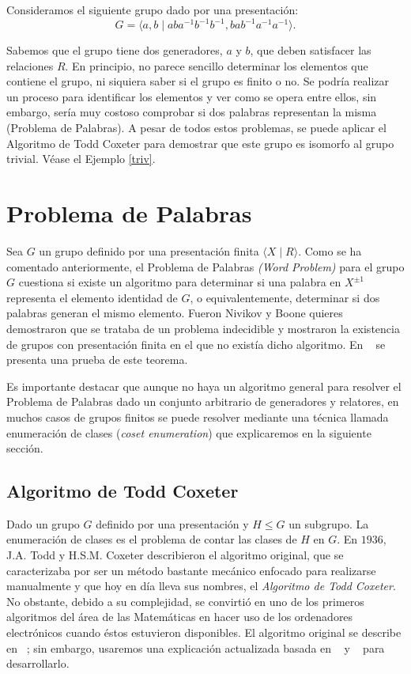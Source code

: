 \newpage
\begin{Ejemplo} \label{triv}
Consideramos el siguiente grupo dado por una presentación:
\[
    G =   \langle a,b \mid aba^{-1}b^{-1}b^{-1}, bab^{-1}a^{-1}a^{-1} \rangle .
\]

Sabemos que el grupo tiene dos generadores, $a$ y $b$, que deben satisfacer las relaciones $R$. En principio, no parece sencillo determinar los elementos que contiene el grupo, ni siquiera saber si el grupo es finito o no. Se podría realizar un proceso para identificar los elementos y ver como se opera entre ellos, sin embargo, sería muy costoso comprobar si dos palabras representan la misma (Problema de Palabras). A pesar de todos estos problemas, se puede aplicar el Algoritmo de Todd Coxeter para demostrar que este grupo es isomorfo al grupo trivial. Véase el Ejemplo \ref{triv}.

\end{Ejemplo}


\section{Problema de Palabras} \label{next22}

Sea $G$ un grupo definido por una presentación finita $\langle X \mid R \rangle $. Como se ha comentado anteriormente, el Problema de Palabras \textit{(Word Problem)} para el grupo $G$ cuestiona si existe un algoritmo para determinar si una palabra en $X^{\pm 1}$ representa el elemento identidad de $G$, o equivalentemente, determinar si dos palabras generan el mismo elemento.  Fueron Nivikov y Boone quieres demostraron que se trataba de un problema indecidible y mostraron la existencia de grupos con presentación finita en el que no existía dicho algoritmo. En ~\cite{boone} se presenta una prueba de este teorema.

Es importante destacar que aunque no haya un algoritmo general para resolver el Problema de Palabras dado un conjunto arbitrario de generadores y relatores, en muchos casos de grupos finitos se puede resolver mediante una técnica llamada enumeración de clases (\textit{coset enumeration}) que explicaremos en la siguiente sección.


\subsection{Algoritmo de Todd Coxeter} \label{TC}
Dado un grupo $G$ definido por una presentación y $H\leq G$ un subgrupo. La enumeración de clases es el problema de contar las clases de $H$ en $G$. En $1936$, J.A. Todd y H.S.M. Coxeter describieron el algoritmo original, que se caracterizaba por ser un método bastante mecánico enfocado para realizarse manualmente y que hoy en día lleva sus nombres, el \textit{Algoritmo de Todd Coxeter}. No obstante,  debido a su complejidad, se convirtió en uno de los primeros algoritmos del área de las Matemáticas en hacer uso de los ordenadores electrónicos cuando éstos estuvieron disponibles. El algoritmo original se describe en ~\cite{todd}; sin embargo, usaremos una explicación actualizada basada en ~\cite{kmill} y ~\cite{green} para desarrollarlo.


